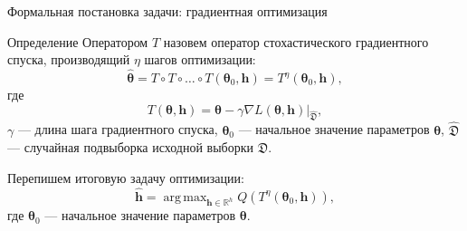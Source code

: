 \documentclass[10pt,pdf,utf8,russian,aspectratio=169]{beamer}
\DeclareMathOperator*{\argmax}{arg\,max}
\begin{document}
\begin{frame}{Формальная постановка задачи: градиентная оптимизация}
\begin{block}{Определение}
Оператором $T$ назовем оператор стохастического градиентного спуска, производящий $\eta$ шагов оптимизации:
\begin{equation}
\label{eq:gd}
	 \hat{\boldsymbol{\theta}} = T \circ T \circ \dots \circ T(\boldsymbol{\theta}_0, \mathbf{h}) = T^\eta(\boldsymbol{\theta}_0, \mathbf{h}),
\end{equation}
где 
$$
	T(\boldsymbol{\theta}, \mathbf{h}) =\boldsymbol{\theta} - \gamma \nabla L(\boldsymbol{\theta}, \mathbf{h})|_{\hat{\mathfrak{D}}}, 
$$
$\gamma$ --- длина шага градиентного спуска, $\boldsymbol{\theta}_0$ --- начальное значение параметров $\boldsymbol{\theta}$, $\hat{\mathfrak{D}}$ --- случайная подвыборка исходной выборки $\mathfrak{D}$.
\end{block}


Перепишем итоговую задачу оптимизации:
\[
	\hat{\mathbf{h}} = \argmax_{\mathbf{h} \in \mathbb{R}^h} Q( T^\eta(\boldsymbol{\theta}_0, \mathbf{h})),
\]
где $\boldsymbol{\theta}_0$ --- начальное значение параметров $\boldsymbol{\theta}$.


\end{frame}
\end{document}
